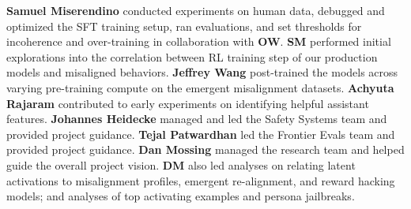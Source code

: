 \textbf{Samuel Miserendino} conducted experiments on human data, debugged and optimized the SFT training setup, ran evaluations, and set thresholds for incoherence and over-training in collaboration with \textbf{OW}. \textbf{SM} performed initial explorations into the correlation between RL training step of our production models and misaligned behaviors.
\textbf{Jeffrey Wang} post-trained the models across varying pre-training compute on the emergent misalignment datasets.
\textbf{Achyuta Rajaram} contributed to early experiments on identifying helpful assistant features.
\textbf{Johannes Heidecke} managed and led the Safety Systems team and provided project guidance.
\textbf{Tejal Patwardhan} led the Frontier Evals team and provided project guidance.
\textbf{Dan Mossing} managed the research team and helped guide the overall project vision. \textbf{DM} also led analyses on relating latent activations to misalignment profiles, emergent re-alignment, and reward hacking models; and analyses of top activating examples and persona jailbreaks.
